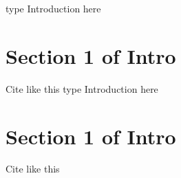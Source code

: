 type Introduction here

\section{Section 1 of Intro}
Cite like this type Introduction here

\section{Section 1 of Intro}
Cite like this 